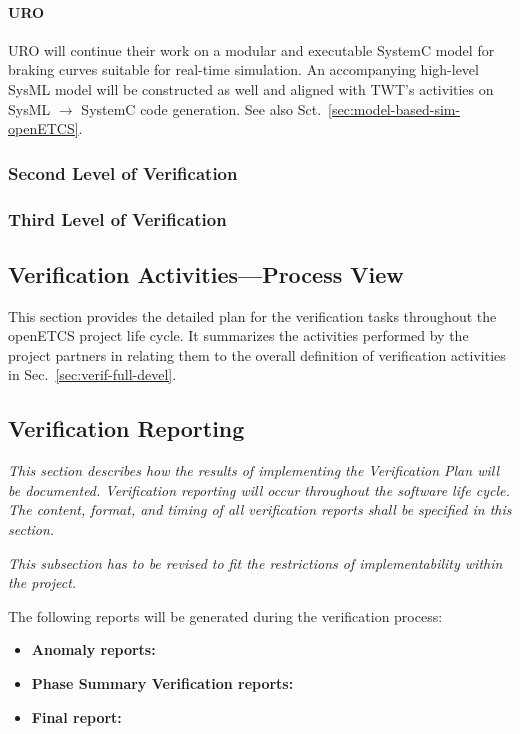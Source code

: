 \documentclass{template/openetcs_report}
\begin{document}
\paragraph{URO}
  URO will continue their work on a  modular and executable SystemC model for
  braking curves suitable for real-time simulation. An accompanying high-level SysML model 
  will be constructed as well and aligned with TWT's activities on SysML $\rightarrow$ SystemC code generation.
  See also Sct.~\ref{sec:model-based-sim-openETCS}.


\subsubsection{Second Level of Verification}
\label{sec:secon-level-verif}

\subsubsection{Third Level of Verification}
\label{sec:third-level-verif}


\subsection{Verification Activities---Process View}
\label{sec:verif-activ-proce}
This section provides the detailed plan for the verification tasks
throughout the openETCS project life cycle. It summarizes the
activities performed by the project partners in relating them to the
overall definition of verification activities in
Sec.~\ref{sec:verif-full-devel}. 

\subsection{Verification Reporting}
\textit{This section describes how the results of implementing the Verification Plan will be documented.
Verification reporting will occur throughout the software life cycle.
The content, format, and timing of all verification reports shall be specified in this section.}

\textit{This subsection has to be revised to fit the restrictions of implementability within the project.}

The following reports will be generated during the verification process:
\begin{itemize}
\item \textbf{Anomaly reports:} 
\item \textbf{Phase Summary Verification reports:} 
\item \textbf{Final report:}
\end{itemize}
\end{document}
